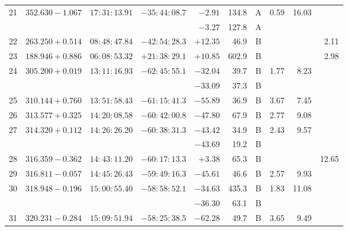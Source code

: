 {\begin{longtable}{l lll r r c rrr}
21   &  $352.630-1.067$   &  $17:31:13.91$    & $-35:44:08.7$    & $  -2.91 $ &   134.8&       A    &    0.59  &   16.03   &           \\
     &  $             $   &  $           $    & $           $    & $  -3.27 $ &   127.8&       A    &          &           &           \\
22   &  $263.250+0.514$   &  $08:48:47.84$    & $-42:54:28.3$    & $ +12.35 $ &    46.9&       B    &          &           &    2.11   \\
23   &  $188.946+0.886$   &  $06:08:53.32$    & $+21:38:29.1$    & $ +10.85 $ &   602.9&       B    &          &           &    2.98   \\
24   &  $305.200+0.019$   &  $13:11:16.93$    & $-62:45:55.1$    & $ -32.04 $ &    39.7&       B    &    1.77  &    8.23   &           \\
     &  $             $   &  $           $    & $           $    & $ -33.09 $ &    37.3&       B    &          &           &           \\
25   &  $310.144+0.760$   &  $13:51:58.43$    & $-61:15:41.3$    & $ -55.89 $ &    36.9&       B    &    3.67  &    7.45   &           \\
26   &  $313.577+0.325$   &  $14:20:08.58$    & $-60:42:00.8$    & $ -47.80 $ &    67.9&       B    &    2.77  &    9.08   &           \\
27   &  $314.320+0.112$   &  $14:26:26.20$    & $-60:38:31.3$    & $ -43.42 $ &    34.9&       B    &    2.43  &    9.57   &           \\
     &  $             $   &  $           $    & $           $    & $ -43.69 $ &    19.2&       B    &          &           &           \\
28   &  $316.359-0.362$   &  $14:43:11.20$    & $-60:17:13.3$    & $  +3.38 $ &    65.3&       B    &          &           &   12.65   \\
29   &  $316.811-0.057$   &  $14:45:26.43$    & $-59:49:16.3$    & $ -45.61 $ &    46.6&       B    &    2.57  &    9.93   &           \\
30   &  $318.948-0.196$   &  $15:00:55.40$    & $-58:58:52.1$    & $ -34.63 $ &   435.3&       B    &    1.83  &   11.08   &           \\
     &  $             $   &  $           $    & $           $    & $ -36.30 $ &    63.1&       B    &          &           &           \\
31   &  $320.231-0.284$   &  $15:09:51.94$    & $-58:25:38.5$    & $ -62.28 $ &    49.7&       B    &    3.65  &    9.49   &           \\

\end{longtable}}
